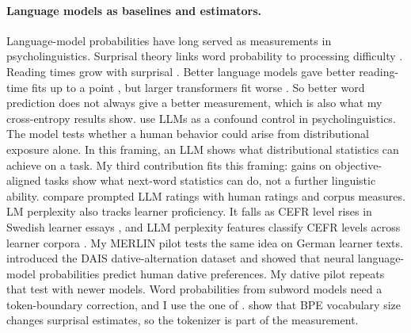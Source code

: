 \documentclass[11pt]{article}
\begin{document}
\paragraph{Language models as baselines and estimators.} Language-model
probabilities have long served as measurements in psycholinguistics. Surprisal
theory links word probability to processing difficulty
\citep{hale2001earley,levy2008expectation}. Reading times grow with surprisal
\citep{smithlevy2013logarithmic,shain2024logarithmic}. Better language models
gave better reading-time fits up to a point
\citep{goodkind2018surprisal,wilcox2020predictive}, but larger transformers
fit worse \citep{ohschuler2023surprisal}. So better word prediction does not
always give a better measurement, which is also what my cross-entropy results
show. \citet{trott2026distributional} use LLMs as a confound control in
psycholinguistics. The model tests whether a human behavior could arise from
distributional exposure alone. In this framing, an LLM shows what
distributional statistics can achieve on a task. My third contribution fits
this framing: gains on objective-aligned tasks show what next-word statistics
can do, not a further linguistic ability.
\citet{zhong2025ratings} compare prompted LLM
ratings with human ratings and corpus measures. LM perplexity also tracks
learner proficiency. It falls as CEFR level rises in Swedish learner essays
\citep{munozsanchez2024perplexity}, and LLM perplexity features classify CEFR
levels across learner corpora \citep{stearns2026cefr}. My MERLIN pilot tests
the same idea on German learner texts. \citet{hawkins2020dais}
introduced the DAIS dative-alternation dataset and showed that neural
language-model probabilities predict human dative preferences. My dative pilot
repeats that test with newer models. Word probabilities from subword models
need a token-boundary correction, and I use the one of
\citet{pimentel2024word}. \citet{nguyenarehalli2026tokenizer} show that BPE
vocabulary size changes surprisal estimates, so the tokenizer is part of the
measurement.
\end{document}
